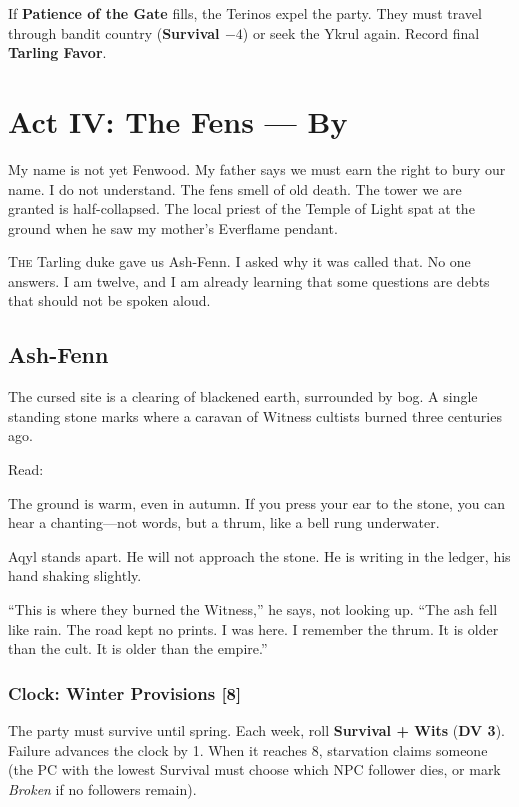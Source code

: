 \documentclass[11pt,a5paper]{book}
\newcommand{\dv}[1]{\textbf{DV #1}}
\newcommand{\clock}[1]{\textbf{[#1]}}
\newcommand{\condition}[1]{\textit{#1}}
\begin{document}
If \textbf{Patience of the Gate} fills, the Terinos expel the party. They must travel through bandit country (\textbf{Survival $-4$}) or seek the Ykrul again. Record final \textbf{Tarling Favor}.

\clearpage

\chapter{Act IV: The Fens --- By \heir}

\epigraph{My name is not yet Fenwood. My father says we must earn the right to bury our name. I do not understand. The fens smell of old death. The tower we are granted is half-collapsed. The local priest of the Temple of Light spat at the ground when he saw my mother's Everflame pendant.}{\heir}

\lettrine{T}{he} Tarling duke gave us Ash-Fenn. I asked why it was called that. No one answers. I am twelve, and I am already learning that some questions are debts that should not be spoken aloud.

\section*{Ash-Fenn}

The cursed site is a clearing of blackened earth, surrounded by bog. A single standing stone marks where a caravan of Witness cultists burned three centuries ago.

Read:
\begin{quoting}
The ground is warm, even in autumn. If you press your ear to the stone, you can hear a chanting---not words, but a thrum, like a bell rung underwater. 

Aqyl stands apart. He will not approach the stone. He is writing in the ledger, his hand shaking slightly. 

``This is where they burned the Witness,'' he says, not looking up. ``The ash fell like rain. The road kept no prints. I was here. I remember the thrum. It is older than the cult. It is older than the empire.''
\end{quoting}

\subsection*{Clock: Winter Provisions \clock{8}}

The party must survive until spring. Each week, roll \textbf{Survival + Wits} (\dv{3}). Failure advances the clock by 1. When it reaches 8, starvation claims someone (the PC with the lowest Survival must choose which NPC follower dies, or mark \condition{Broken} if no followers remain).
\end{document}
